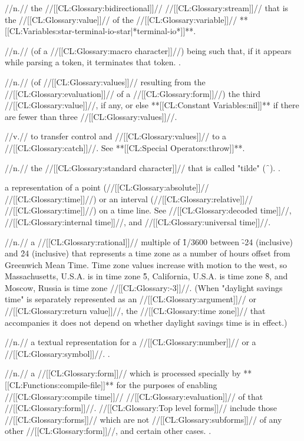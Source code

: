  //n.// the //[[CL:Glossary:bidirectional]]// //[[CL:Glossary:stream]]// that is the //[[CL:Glossary:value]]// of the //[[CL:Glossary:variable]]// **[[CL:Variables:star-terminal-io-star|*terminal-io*]]**.

 //n.// (of a //[[CL:Glossary:macro character]]//) being such that, if it appears while parsing a token, it terminates that token. \Seesection\ReaderAlgorithm.

 //n.// (of //[[CL:Glossary:values]]// resulting from the //[[CL:Glossary:evaluation]]// of a //[[CL:Glossary:form]]//) the third //[[CL:Glossary:value]]//, if any, or else **[[CL:Constant Variables:nil]]** if there are fewer than three //[[CL:Glossary:values]]//.

 //v.// to transfer control and //[[CL:Glossary:values]]// to a //[[CL:Glossary:catch]]//. See **[[CL:Special Operators:throw]]**.

 //n.// the //[[CL:Glossary:standard character]]// that is called "tilde" (\f{~}). \Seefigure\StdCharsThree.

 a representation of a point (//[[CL:Glossary:absolute]]// //[[CL:Glossary:time]]//) or an interval (//[[CL:Glossary:relative]]// //[[CL:Glossary:time]]//) on a time line. See //[[CL:Glossary:decoded time]]//, //[[CL:Glossary:internal time]]//, and //[[CL:Glossary:universal time]]//.

 //n.// a //[[CL:Glossary:rational]]// multiple of \f{1/3600} between \f{-24} (inclusive) and \f{24} (inclusive) that represents a time zone as a number of hours offset from Greenwich Mean Time. Time zone values increase with motion to the west, so Massachusetts, U.S.A. is in time zone \f{5}, California, U.S.A. is time zone \f{8}, and Moscow, Russia is time zone //[[CL:Glossary:-3]]//. (When "daylight savings time" is separately represented as an //[[CL:Glossary:argument]]// or //[[CL:Glossary:return value]]//, the //[[CL:Glossary:time zone]]// that accompanies it does not depend on whether daylight savings time is in effect.)

 //n.// a textual representation for a //[[CL:Glossary:number]]// or a //[[CL:Glossary:symbol]]//. \Seesection\InterpOfTokens.

 //n.// a //[[CL:Glossary:form]]// which is processed specially by **[[CL:Functions:compile-file]]** for the purposes of enabling //[[CL:Glossary:compile time]]// //[[CL:Glossary:evaluation]]// of that //[[CL:Glossary:form]]//. //[[CL:Glossary:Top level forms]]// include those //[[CL:Glossary:forms]]// which are not //[[CL:Glossary:subforms]]// of any other //[[CL:Glossary:form]]//, and certain other cases. \Seesection\TopLevelForms.
 
